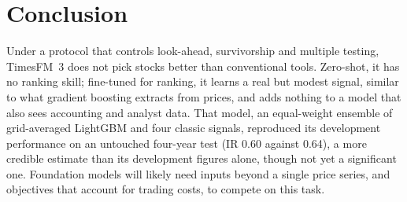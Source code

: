 \section{Conclusion}
\label{sec:conclusion}

Under a protocol that controls look-ahead, survivorship and multiple testing, TimesFM~3 does not pick stocks better than conventional tools.
Zero-shot, it has no ranking skill; fine-tuned for ranking, it learns a real but modest signal, similar to what gradient boosting extracts from prices, and adds nothing to a model that also sees accounting and analyst data.
That model, an equal-weight ensemble of grid-averaged LightGBM and four classic signals, reproduced its development performance on an untouched four-year test (IR 0.60 against 0.64), a more credible estimate than its development figures alone, though not yet a significant one.
Foundation models will likely need inputs beyond a single price series, and objectives that account for trading costs, to compete on this task.
